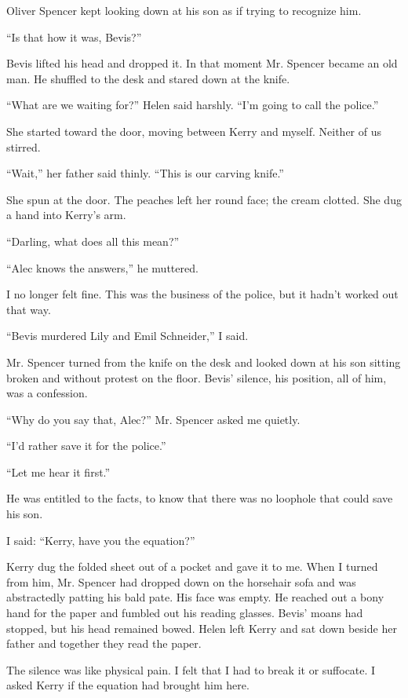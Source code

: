 \documentclass{novel}
\begin{document}
Oliver Spencer kept looking down at his son as if trying to recognize him.

“Is that how it was, Bevis?”

Bevis lifted his head and dropped it. In that moment Mr. Spencer became an old man. He shuffled to the desk and stared down at the knife.

“What are we waiting for?” Helen said harshly. “I’m going to call the police.”

She started toward the door, moving between Kerry and myself. Neither of us stirred.

“Wait,” her father said thinly. “This is our carving knife.”

She spun at the door. The peaches left her round face; the cream clotted. She dug a hand into Kerry’s arm.

“Darling, what does all this mean?”

“Alec knows the answers,” he muttered.

I no longer felt fine. This was the business of the police, but it hadn’t worked out that way.

“Bevis murdered Lily and Emil Schneider,” I said.

\scenestars

Mr. Spencer turned from the knife on the desk and looked down at his son sitting broken and without protest on the floor. Bevis’ silence, his position, all of him, was a confession.

“Why do you say that, Alec?” Mr. Spencer asked me quietly.

“I’d rather save it for the police.”

“Let me hear it first.”

He was entitled to the facts, to know that there was no loophole that could save his son.

I said: “Kerry, have you the equation?”

Kerry dug the folded sheet out of a pocket and gave it to me. When I turned from him, Mr. Spencer had dropped down on the horsehair sofa and was abstractedly patting his bald pate. His face was empty. He reached out a bony hand for the paper and fumbled out his reading glasses. Bevis’ moans had stopped, but his head remained bowed. Helen left Kerry and sat down beside her father and together they read the paper.

The silence was like physical pain. I felt that I had to break it or suffocate. I asked Kerry if the equation had brought him here.
\end{document}
